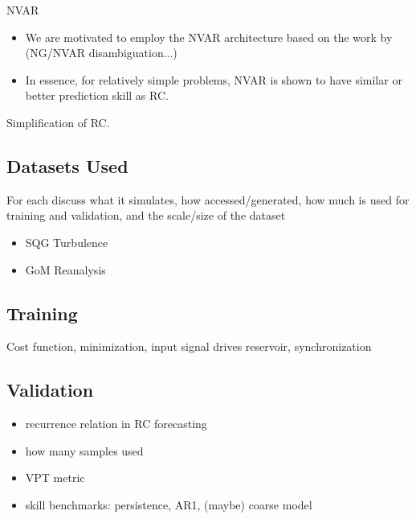 NVAR
\begin{itemize}
    \item We are motivated to employ the NVAR architecture based on the work by
        \citep{gauthier_next_2021} (NG/NVAR disambiguation...)
    \item In essence, for relatively simple problems, NVAR is shown to have
        similar or better prediction skill as RC.
\end{itemize}

Simplification of RC.

\subsection{Datasets Used}
\label{subsec:datasets}

For each discuss what it simulates, how accessed/generated, how much is used for
training and validation, and the scale/size of the dataset
\begin{itemize}
    \item SQG Turbulence
    \item GoM Reanalysis
\end{itemize}

\subsection{Training}
\label{subsec:training}

Cost function, minimization, input signal drives reservoir, synchronization

\subsection{Validation}
\label{subsec:validation}

\begin{itemize}
    \item recurrence relation in RC forecasting
    \item how many samples used
    \item VPT metric
    \item skill benchmarks: persistence, AR1, (maybe) coarse model
\end{itemize}
